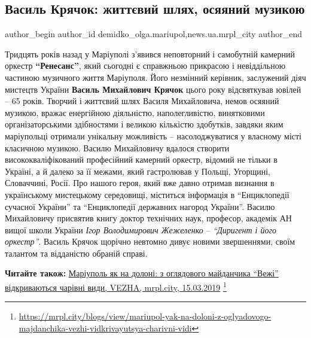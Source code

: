  
 
 
 
 
 
\subsection{Василь Крячок: життєвий шлях, осяяний музикою}
\label{sec:19_03_2019.stz.news.ua.mrpl_city.1.vasyl_krjachok}
 
\ifcmt
 author_begin
   author_id demidko_olga.mariupol,news.ua.mrpl_city
 author_end
\fi


Тридцять років назад у Маріуполі з'явився неповторний і самобутній камерний
оркестр \textbf{\enquote{Ренесанс}}, який сьогодні є справжньою прикрасою і невіддільною
частиною музичного життя Маріуполя. Його незмінний керівник, заслужений діяч
мистецтв України \textbf{Василь Михайлович Крячок} цього року відсвяткував ювілей – 65
років. Творчий і життєвий шлях Василя Михайловича, немов осяяний музикою,
вражає енергійною діяльністю, наполегливістю, винятковими організаторськими
здібностями і великою кількістю здобутків, завдяки яким маріупольці отримали
унікальну можливість – насолоджуватися у власному місті класичною музикою.
Василю Михайловичу вдалося створити висококваліфікований професійний камерний
оркестр, відомий не тільки в Україні, а й далеко за її межами, який гастролював
у Польщі, Угорщині, Словаччині, Росії. Про нашого героя, який вже давно отримав
визнання в українському мистецькому середовищі, міститься інформація в
\enquote{Енциклопедії сучасної України} та \enquote{Енциклопедії державних нагород України}.
Василю Михайловичу присвятив книгу доктор технічних наук, професор, академік АН
вищої школи України \emph{Ігор Володимирович Жежеленко} – \emph{\enquote{Диригент і його оркестр}}.
Василь Крячок щорічно невтомно дивує новими звершеннями, своїм талантом та
відданістю обраній справі.

\medskip
\begin{minipage}{0.9\textwidth}
\textbf{Читайте також:} \href{https://mrpl.city/blogs/view/mariupol-yak-na-doloni-z-oglyadovogo-majdanchika-vezhi-vidkrivayutsya-charivni-vidi}{Маріуполь як на долоні: з оглядового майданчика \enquote{Вежі} відкриваються чарівні види, VEZHA, mrpl.city, 15.03.2019}%
\footnote{\url{https://mrpl.city/blogs/view/mariupol-yak-na-doloni-z-oglyadovogo-majdanchika-vezhi-vidkrivayutsya-charivni-vidi}}
\end{minipage}
\medskip

